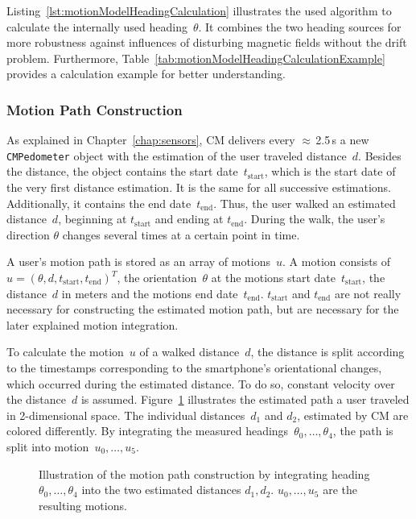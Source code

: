 Listing~\ref{lst:motionModelHeadingCalculation} illustrates the used algorithm to calculate the internally used heading~$\theta$. It combines the two heading sources for more robustness against influences of disturbing magnetic fields without the drift problem. Furthermore, Table~\ref{tab:motionModelHeadingCalculationExample} provides a calculation example for better understanding.



\subsubsection*{Motion Path Construction}
As explained in Chapter~\ref{chap:sensors}, \acs{CM} delivers every $\approx$\,2.5\,s a new \texttt{CMPedometer} object with the estimation of the user traveled distance~$d$. Besides the distance, the object contains the start date~$t_\text{start}$, which is the start date of the very first distance estimation. It is the same for all successive estimations. Additionally, it contains the end date~$t_\text{end}$. Thus, the user walked an estimated distance~$d$, beginning at $t_\text{start}$ and ending at $t_\text{end}$. During the walk, the user's direction $\theta$ changes several times at a certain point in time.

A user's motion path is stored as an array of motions~$u$. A motion consists of $u = (\theta, d, t_\text{start}, t_\text{end})^T$, the orientation~$\theta$ at the motions start date~$t_\text{start}$, the distance~$d$ in meters and the motions end date~$t_\text{end}$. $t_\text{start}$ and $t_\text{end}$ are not really necessary for constructing the estimated motion path, but are necessary for the later explained motion integration.

To calculate the motion~$u$ of a walked distance~$d$, the distance is split according to the timestamps corresponding to the smartphone's orientational changes, which occurred during the estimated distance. To do so, constant velocity over the distance~$d$ is assumed. Figure~\ref{fig:mm_path} illustrates the estimated path a user traveled in 2-dimensional space. The individual distances~$d_1$ and $d_2$, estimated by \acs{CM} are colored differently. By integrating the measured headings~$\theta_0, \ldots, \theta_4$, the path is split into motion~$u_0, \ldots, u_5$.

\begin{figure}
	
	\caption{Illustration of the motion path construction by integrating heading $\theta_0, \ldots, \theta_4$ into the two estimated distances $d_1, d_2$. $u_0, \ldots, u_5$ are the resulting motions.}
	\label{fig:mm_path}
\end{figure}


